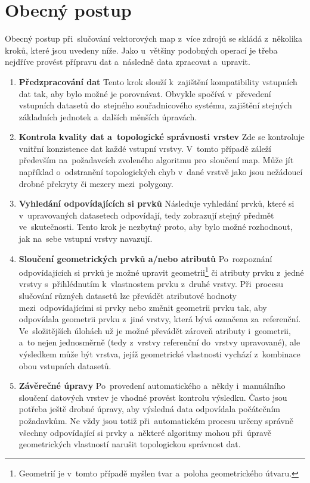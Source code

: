 \section{Obecný postup}
\label{postup}

Obecný postup při~slučování vektorových map z~více zdrojů se skládá z~několika
kroků, které jsou uvedeny níže. Jako u~většiny podobných operací je třeba 
nejdříve provést přípravu dat a~následně data zpracovat a~upravit.

\begin{enumerate}
  \item \textbf{Předzpracování dat}
    \subitem Tento krok slouží k~zajištění kompatibility vstupních dat tak, 
      aby bylo možné je porovnávat. Obvykle spočívá v~převedení vstupních 
      datasetů do~stejného souřadnicového systému, zajištění stejných 
      základních jednotek a~dalších měnších úpravách. 
  \item \textbf{Kontrola kvality dat a~topologické správnosti vrstev}
    \subitem Zde se kontroluje vnitřní konzistence dat každé vstupní vrstvy.
      V~tomto případě záleží především na~požadavcích zvoleného algoritmu 
      pro~sloučení map. Může jít například o~odstranění topologických chyb 
      v~dané vrstvě jako jsou nežádoucí drobné překryty či mezery 
      mezi~polygony.
  \item \textbf{Vyhledání odpovídajících si prvků}
      \subitem Následuje vyhledání prvků, které si v~upravovaných datasetech
      odpovídají, tedy zobrazují stejný předmět ve~skutečnosti. Tento krok je 
      nezbytný proto, aby bylo možné rozhodnout, jak na~sebe vstupní vrstvy 
      navazují.
  \item \textbf{Sloučení geometrických prvků a/nebo atributů}
      \subitem Po~rozpoznání odpovídajících si prvků je možné upravit 
      geometrii\footnote{Geometrií je v~tomto případě myšlen tvar a~poloha 
      geometrického útvaru.} či atributy prvku z~jedné vrstvy s~přihlédnutím 
      k~vlastnostem prvku z~druhé vrstvy. Při~procesu slučování různých datasetů 
      lze převádět atributové hodnoty mezi~odpo\-vídajícími si prvky nebo změnit  
      geometrii prvku tak, aby odpovídala geometrii prvku z~jiné vrstvy, která 
      bývá označena za~referenční. Ve~slo\-ži\-tějších úlohách už je možné převádět 
      zároveň atributy i~geometrii, a~to nejen jednosměrně (tedy z~vrstvy referenční 
      do~vrstvy upravované), ale výsledkem může být vrstva, jejíž geometrické
      vlastnosti vychází z~kombinace obou vstupních datasetů.
  \item \textbf{Závěrečné úpravy}
      \subitem Po~provedení automatického a~někdy i~manuálního sloučení datových
      vrstev je vhodné provést kontrolu výsledku. Často jsou potřeba ještě drobné
      úpravy, aby výsledná data odpovídala počátečním požadavkům. Ne vždy jsou 
      totiž při~automatickém procesu určeny správně všechny odpovídající si prvky
      a~některé algoritmy mohou při~úpravě geometrických vlastností narušit 
      topologickou správnost dat.
\end{enumerate}
